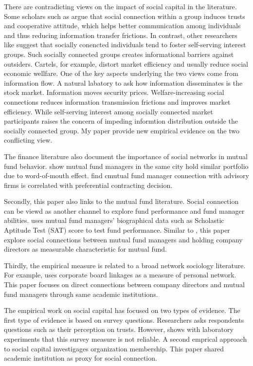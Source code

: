 \documentclass[11pt]{article}
\begin{document}
\begin{doublespace}
There are contradicting views on the impact of social capital in the literature. Some scholars such as \cite{putnam1994making} argue that social connection within a group induces trusts and cooperative attitude, which helps better communication among individuals and thus reducing information transfer frictions. In contrast, other researchers like \cite{olson1982rise} suggest that socially conencted individuals tend to foster self-serving interest groups. Such socially connected groups creates informational barriers against outsiders. Cartels, for example, distort market efficiency and usually reduce social economic wellfare. One of the key aspects underlying the two views come from information flow. A natural labatory to ask how information disseminates is the stock market. Information moves security prices. Welfare-increasing social connections reduces information transmission frictions and improves market efficiency. While self-serving interest among socially connected market participants raises the concern of impeding informtion distribution outside the socially connected group.
My paper provide new empirical evidence on the two conflicting view.

The finance literature also document the importance of social networks in mutual fund behavior. \cite{hong2005thy} show mutual fund managers in the same city hold similar portfolio due to word-of-mouth effect. \cite{kuhnen2005social} find cmutual fund manager connection with advisory firms is correlated with preferential contracting decision. 

Secondly, this paper also links to the mutual fund literature. Social connection can be viewd as another channel to explore fund performance and fund manager abilities. \cite{chevalier1999some} uses mutual fund managers' biographical data such as Scholastic Aptitude Test (SAT) score to test fund performance. Similar to \cite{cohen2008small}, this paper explore social connections between mutual fund managers and holding company directors as measurable characteristic for mutual fund. 

Thirdly, the empirical measure is related to a broad network sociology literature. For example, \cite{useem1984inner} uses corporate board linkages as a measure of personal network. This paper focuses on direct connections between company directors and mutual fund managers through same academic institutions.

The empirical work on social capital has focused on two types of evidence. The first type of evidence is based on survey questions. Researchers asks respondents questions such as their perception on trusts. However, \cite{glaeser2000measuring} shows with laboratory experiments that this survey measure is not reliable. A second emprical approach to social capital investigages organization membership. This paper shared academic institution as proxy for social connection. 


\end{doublespace}
\end{document}
